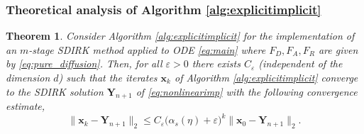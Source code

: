 \documentclass[10pt,a4paper]{article}
\newtheorem{theorem}{Theorem}[section]
\begin{document}



 



\subsubsection{Theoretical analysis of Algorithm \ref{alg:explicitimplicit}} \label{subsubsec:analysis}

\begin{theorem}\label{thm:diff}
Consider Algorithm \ref{alg:explicitimplicit} for the implementation of an $m$-stage SDIRK  method applied to ODE \eqref{eq:main}  where  $F_{D}, F_{A}, F_{R}$ are given by \eqref{eq:pure_diffusion}.
Then, for all $\varepsilon>0$ there exists $C_\varepsilon$ (independent of the dimension $d$) such that the iterates $\boldsymbol{x}_k$ of Algorithm \ref{alg:explicitimplicit} converge to the
SDIRK solution $\boldsymbol{Y}_{n+1}$ of \eqref{eq:nonlinearimp} with the following convergence estimate,
\begin{equation} \label{eq:proof1}
\|
\boldsymbol{x}_k - \boldsymbol{Y}_{n+1}
\|_2 \leq C_\varepsilon \big(\alpha_{s}(\eta) + \varepsilon\big)^k 
\|
\boldsymbol{x}_0 - \boldsymbol{Y}_{n+1}
\|_2.
\end{equation}
\end{theorem}
\end{document}
